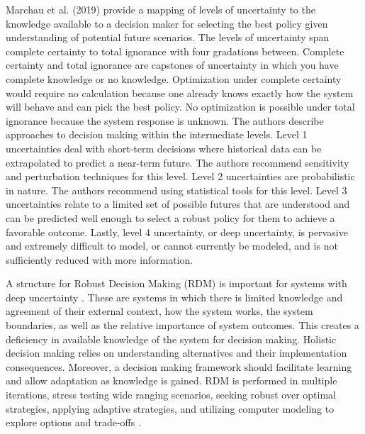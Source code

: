 \documentclass[a4paper]{article}
\begin{document}

Marchau et al. (2019) \cite{marchau_decision_2019} provide a mapping of levels of uncertainty to the knowledge available to a decision maker for selecting the best policy given understanding of potential future scenarios. The levels of uncertainty span complete certainty to total ignorance with four gradations between. Complete certainty and total ignorance are capstones of uncertainty in which you have complete knowledge or no knowledge. Optimization under complete certainty would require no calculation because one already knows exactly how the system will behave and can pick the best policy. No optimization is possible under total ignorance because the system response is unknown. The authors describe approaches to decision making within the intermediate levels. Level 1 uncertainties deal with short-term decisions where historical data can be extrapolated to predict a near-term future. The authors recommend sensitivity and perturbation techniques for this level. Level 2 uncertainties are probabilistic in nature. The authors recommend using statistical tools for this level. Level 3 uncertainties relate to a limited set of possible futures that are understood and can be predicted well enough to select a robust policy for them to achieve a favorable outcome. Lastly, level 4 uncertainty, or deep uncertainty, is pervasive and extremely difficult to model, or cannot currently be modeled, and is not sufficiently reduced with more information.

A structure for Robust Decision Making (RDM) is important for systems with deep uncertainty \cite{marchau_decision_2019}. These are systems in which there is limited knowledge and agreement of their external context, how the system works, the system boundaries, as well as the relative importance of system outcomes. This creates a deficiency in available knowledge of the system for decision making. Holistic decision making relies on understanding alternatives and their implementation consequences. Moreover, a decision making framework should facilitate learning and allow adaptation as knowledge is gained. RDM is performed in multiple iterations, stress testing wide ranging scenarios, seeking robust over optimal strategies, applying adaptive strategies, and utilizing computer modeling to explore options and trade-offs \cite{marchau_decision_2019}.
\end{document}
